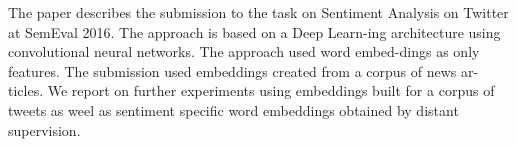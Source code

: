 The paper describes the submission to the task on Sentiment Analysis on Twitter at SemEval 2016. The approach is based on a Deep Learn-ing architecture using convolutional neural networks. The approach used word embed-dings as only features. The submission used embeddings created from a corpus of news ar-ticles. We report on further experiments using embeddings built for a corpus of tweets as weel as sentiment specific word embeddings obtained by distant supervision.
